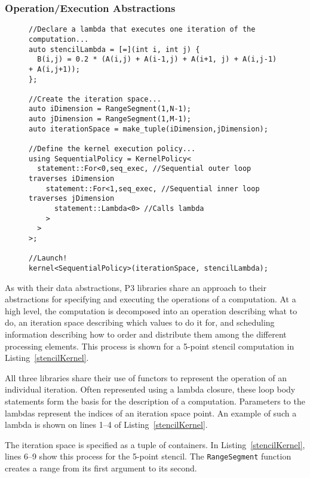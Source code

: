 \subsubsection{Operation/Execution Abstractions}
\begin{figure}
\begin{lstlisting}[caption={Specification of a 5-point stencil kernel using RAJA.}, label=stencilKernel]
//Declare a lambda that executes one iteration of the computation...
auto stencilLambda = [=](int i, int j) {
  B(i,j) = 0.2 * (A(i,j) + A(i-1,j) + A(i+1, j) + A(i,j-1) + A(i,j+1));
};

//Create the iteration space...
auto iDimension = RangeSegment(1,N-1);
auto jDimension = RangeSegment(1,M-1);
auto iterationSpace = make_tuple(iDimension,jDimension);

//Define the kernel execution policy...
using SequentialPolicy = KernelPolicy<
  statement::For<0,seq_exec, //Sequential outer loop traverses iDimension
    statement::For<1,seq_exec, //Sequential inner loop traverses jDimension
      statement::Lambda<0> //Calls lambda
    >
  >
>;

//Launch!
kernel<SequentialPolicy>(iterationSpace, stencilLambda);
\end{lstlisting}
\end{figure}

As with their data abstractions, P3 libraries share an approach to their abstractions for specifying and executing the operations of a computation.
At a high level, the computation is decomposed into an operation describing what to do, an iteration space describing which values to do it for, and scheduling information describing how to order and distribute them among the different processing elements.
This process is shown for a 5-point stencil computation in Listing~\ref{stencilKernel}.

All three libraries share their use of functors to represent the operation of an individual iteration.
Often represented using a lambda closure, these loop body statements form the basis for the description of a computation.
Parameters to the lambdas represent the indices of an iteration space point. 
An example of such a lambda is shown on lines 1--4 of Listing~\ref{stencilKernel}.

The iteration space is specified as a tuple of containers.
In Listing~\ref{stencilKernel}, lines 6--9 show this process for the 5-point stencil. 
The \verb.RangeSegment. function creates a range from its first argument to its second.

